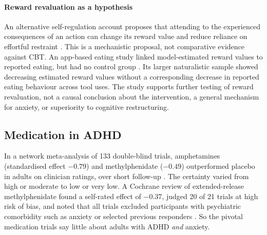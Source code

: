 \paragraph{Reward revaluation as a hypothesis}
An alternative self-regulation account proposes that attending to the experienced consequences of an action can change its reward value and reduce reliance on effortful restraint \citep{ludwig2020selfregulation}.
This is a mechanistic proposal, not comparative evidence against CBT.
An app-based eating study linked model-estimated reward values to reported eating, but had no control group \citep{taylor2021awareness}.
Its larger naturalistic sample showed decreasing estimated reward values without a corresponding decrease in reported eating behaviour across tool uses.
The study supports further testing of reward revaluation, not a causal conclusion about the intervention, a general mechanism for anxiety, or superiority to cognitive restructuring.

\subsection{Medication in ADHD}
In a network meta-analysis of 133 double-blind trials, amphetamines (standardised effect $-0.79$) and methylphenidate ($-0.49$) outperformed placebo in adults on clinician ratings, over short follow-up \citep{cortese2018adhdmeds}.
The certainty varied from high or moderate to low or very low.
A Cochrane review of extended-release methylphenidate found a self-rated effect of $-0.37$, judged 20 of 21 trials at high risk of bias, and noted that all trials excluded participants with psychiatric comorbidity such as anxiety or selected previous responders \citep{boesen2022ermph}.
So the pivotal medication trials say little about adults with ADHD \emph{and} anxiety.
